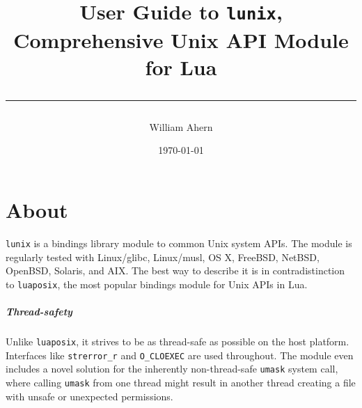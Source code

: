\documentclass[11pt, oneside]{memoir}
\newcommand*{\lunix}[0]{\texttt{lunix}\xspace}
\newcommand*{\luaposix}[0]{\texttt{luaposix}\xspace}
\newcommand*{\fn}[1]{\texttt{#1}\xspace}
\newcommand*{\const}[1]{\texttt{#1}\xspace}
\begin{document}

\title{

\vspace*{10ex}

\HUGE\sffamily User Guide to \lunix, \\


\HUGE Comprehensive Unix API Module for Lua \\

\vspace*{30pt}
\hrule
}

\date{\today}
\author{William Ahern}
\maketitle
\thispagestyle{empty}
\clearpage

\setcounter{page}{1}
\tableofcontents

\clearpage

\setcounter{page}{1}

\setlength{\beforechapskip}{1ex}
\setlength{\afterchapskip}{1ex}

\chapter{About}

\lunix is a bindings library module to common Unix system APIs. The module is regularly tested with Linux/glibc, Linux/musl, OS X, FreeBSD, NetBSD, OpenBSD, Solaris, and AIX. The best way to describe it is in contradistinction to \luaposix, the most popular bindings module for Unix APIs in Lua.

\paragraph{Thread-safety}

Unlike \luaposix, it strives to be as thread-safe as possible on the host platform. Interfaces like \fn{strerror\_r} and \const{O\_CLOEXEC} are used throughout. The module even includes a novel solution for the inherently non-thread-safe \fn{umask} system call, where calling \fn{umask} from one thread might result in another thread creating a file with unsafe or unexpected permissions.
\end{document}

